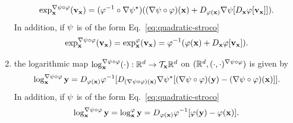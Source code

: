 \begin{proposition}
\begin{enumerate}[label=(\roman*)]
\begin{equation}
             \exp^{\nabla \psi \circ \varphi}_{\mathbf{x}} (\mathbf{v}_{\mathbf{x}}) = (\varphi^{-1} \circ\nabla \psi^\star)((\nabla \psi \circ \varphi)(\mathbf{x}) + D_{\varphi(\mathbf{x})} \nabla \psi [ D_{\mathbf{x}} \varphi[\mathbf{v}_{\mathbf{x}}] ]).
             \label{eq:thm-exp-remetrized}
        \end{equation}
        In addition, if $\psi$ is of the form Eq.~\eqref{eq:quadratic-stroco}
        \begin{equation}
             \exp^{\nabla \psi \circ \varphi}_{\mathbf{x}} (\mathbf{v}_{\mathbf{x}}) = \exp^\varphi_{\mathbf{x}} (\mathbf{v}_{\mathbf{x}}) = \varphi^{-1}(\varphi(\mathbf{x}) + D_{\mathbf{x}} \varphi[\mathbf{v}_{\mathbf{x}}]).
             \label{eq:thm-exp-remetrized-special-psi-}
        \end{equation}
        \item the logarithmic map $\log^{\nabla \psi \circ \varphi}_{\mathbf{x}} (\cdot):\mathbb{R}^d \to \mathcal{T}_{\mathbf{x}} \mathbb{R}^d$  on $(\mathbb{R}^d, (\cdot,\cdot)^{\nabla \psi \circ \varphi})$ is given by 
        \begin{equation}
            \log^{\nabla \psi \circ \varphi}_{\mathbf{x}} \mathbf{y} =  D_{\varphi(\mathbf{x})}\varphi^{-1}[D_{(\nabla \psi \circ \varphi)(\mathbf{x})}\nabla \psi^\star[(\nabla \psi \circ \varphi)(\mathbf{y}) - (\nabla \psi \circ \varphi)(\mathbf{x})]].
            \label{eq:thm-log-remetrized}
        \end{equation}
        In addition, if $\psi$ is of the form Eq.~\eqref{eq:quadratic-stroco}
        \begin{equation}
            \log^{\nabla \psi \circ \varphi}_{\mathbf{x}} \mathbf{y} = \log^\varphi_{\mathbf{x}} \mathbf{y} = D_{\varphi(\mathbf{x})}\varphi^{-1}[\varphi(\mathbf{y}) - \varphi(\mathbf{x})].
            \label{eq:thm-log-remetrized-special-psi-}
        \end{equation}
    \end{enumerate}
\end{proposition}

